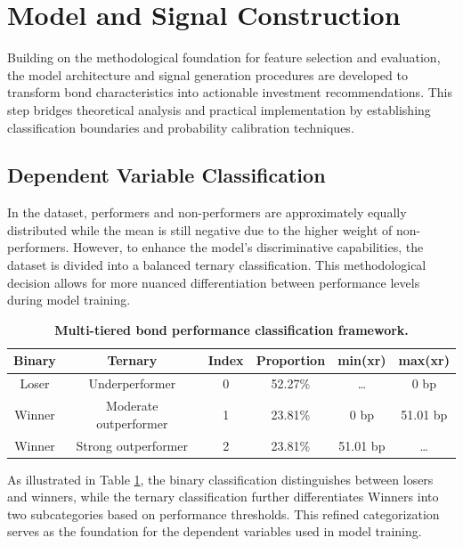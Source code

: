 \section{Model and Signal Construction}
\label{sec:model_signal_construction}

Building on the methodological foundation for feature selection and evaluation, the model architecture and signal generation procedures are developed to transform bond characteristics into actionable investment recommendations. This step bridges theoretical analysis and practical implementation by establishing classification boundaries and probability calibration techniques.

\subsection{Dependent Variable Classification}

In the dataset, performers and non-performers are approximately equally distributed while the mean is still negative due to the higher weight of non-performers. However, to enhance the model's discriminative capabilities, the dataset is divided into a balanced ternary classification. This methodological decision allows for more nuanced differentiation between performance levels during model training.

\begin{table}[h]
\centering
\small
\begin{tabular}{cccccc}\toprule
\textbf{Binary} & \textbf{Ternary} & \textbf{Index} & \textbf{Proportion} & \textbf{min(xr)} & \textbf{max(xr)} \\\midrule
Loser & Underperformer & 0 & 52.27\% & \ldots & 0 bp \\
Winner & Moderate outperformer & 1 & 23.81\% & 0 bp & 51.01 bp \\
Winner & Strong outperformer & 2 & 23.81\% & 51.01 bp & \ldots \\ \bottomrule
\end{tabular}
\caption{\textbf{Multi-tiered bond performance classification framework.}}
\label{tab:performance_classification}
\end{table}

As illustrated in Table \ref{tab:performance_classification}, the binary classification distinguishes between losers and winners, while the ternary classification further differentiates Winners into two subcategories based on performance thresholds. This refined categorization serves as the foundation for the dependent variables used in model training.

